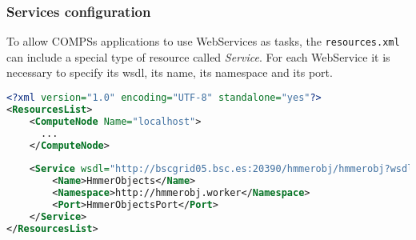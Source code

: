 \subsubsection{Services configuration}
To allow COMPSs applications to use WebServices as tasks, the \texttt{resources.xml} can include a special type of resource called 
\textit{Service}. For each WebService it is necessary to specify its wsdl, its name, its namespace and
its port. 
\begin{lstlisting}[language=xml]
<?xml version="1.0" encoding="UTF-8" standalone="yes"?>
<ResourcesList>
    <ComputeNode Name="localhost">
      ...                                                                                                                                                                                                
    </ComputeNode>  
    
    <Service wsdl="http://bscgrid05.bsc.es:20390/hmmerobj/hmmerobj?wsdl">                                                                                                                                          
        <Name>HmmerObjects</Name>                                                                                                                                                                                  
        <Namespace>http://hmmerobj.worker</Namespace>                                                                                                                                                              
        <Port>HmmerObjectsPort</Port>                                                                                                                                                                              
    </Service>                                                                                                                                                                                                     
</ResourcesList>  
\end{lstlisting}

